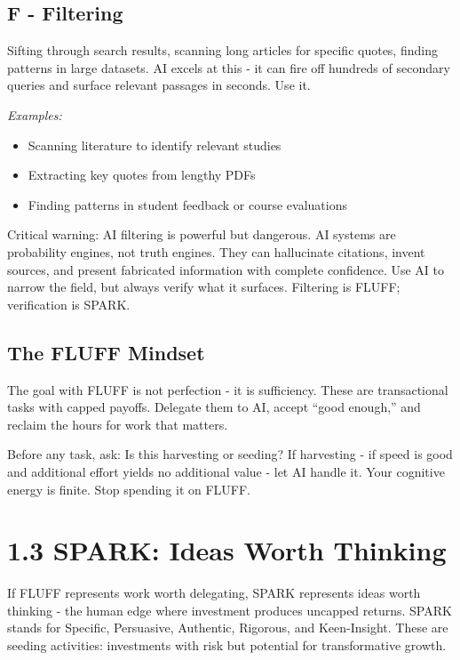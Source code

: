 \documentclass[
  letterpaper,
  DIV=11,
  numbers=noendperiod]{scrreprt}
\providecommand{\tightlist}{%
  \setlength{\itemsep}{0pt}\setlength{\parskip}{0pt}}
\begin{document}
\subsection{F - Filtering}\label{f---filtering}

Sifting through search results, scanning long articles for specific
quotes, finding patterns in large datasets. AI excels at this - it can
fire off hundreds of secondary queries and surface relevant passages in
seconds. Use it.

\emph{Examples:}

\begin{itemize}
\tightlist
\item
  Scanning literature to identify relevant studies
\item
  Extracting key quotes from lengthy PDFs
\item
  Finding patterns in student feedback or course evaluations
\end{itemize}

Critical warning: AI filtering is powerful but dangerous. AI systems are
probability engines, not truth engines. They can hallucinate citations,
invent sources, and present fabricated information with complete
confidence. Use AI to narrow the field, but always verify what it
surfaces. Filtering is FLUFF; verification is SPARK.

\subsection{The FLUFF Mindset}\label{the-fluff-mindset}

The goal with FLUFF is not perfection - it is sufficiency. These are
transactional tasks with capped payoffs. Delegate them to AI, accept
``good enough,'' and reclaim the hours for work that matters.

Before any task, ask: Is this harvesting or seeding? If harvesting - if
speed is good and additional effort yields no additional value - let AI
handle it. Your cognitive energy is finite. Stop spending it on FLUFF.

\section{1.3 SPARK: Ideas Worth
Thinking}\label{spark-ideas-worth-thinking}

If FLUFF represents work worth delegating, SPARK represents ideas worth
thinking - the human edge where investment produces uncapped returns.
SPARK stands for Specific, Persuasive, Authentic, Rigorous, and
Keen-Insight. These are seeding activities: investments with risk but
potential for transformative growth.
\end{document}
